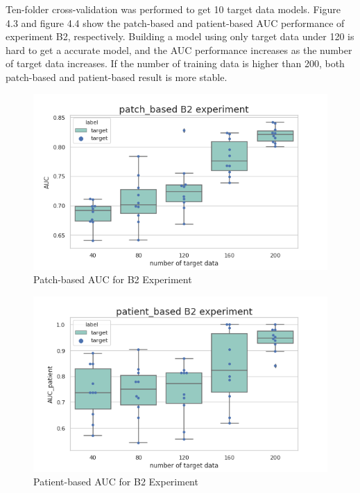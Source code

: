 Ten-folder cross-validation was performed to get 10 target data models. Figure 4.3 and figure 4.4 show the patch-based and patient-based AUC performance of experiment B2, respectively. 
Building a model using only target data under 120 is hard to get a accurate model, and the AUC performance increases as the number of target data increases. If the number of training data is higher than 200, both patch-based and patient-based result is more stable.
\begin{figure}[H]
    \hfil
    \begin{minipage}[t]{0.9\textwidth}
        \includegraphics[width=\textwidth]{fig/B2_num_patch.png}
        \caption{\label{fig:parallel1} Patch-based AUC for B2 Experiment}
    \end{minipage}
    \hfil
\end{figure}
\begin{figure}[H]
    \hfil
    \begin{minipage}[t]{0.9\textwidth}
        \includegraphics[width=\textwidth]{fig/B2_num_patient.png}
        \caption{\label{fig:parallel1} Patient-based AUC for B2 Experiment}
    \end{minipage}
    \hfil
\end{figure}

